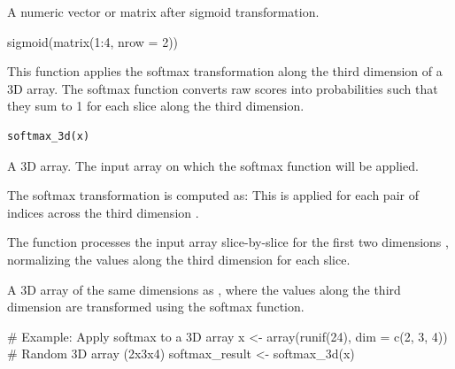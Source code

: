 \documentclass[a4paper]{book}
\begin{document}
%
\begin{Value}
A numeric vector or matrix after sigmoid transformation.
\end{Value}
%
\begin{Examples}
\begin{ExampleCode}
sigmoid(matrix(1:4, nrow = 2))
\end{ExampleCode}
\end{Examples}
%
\begin{Description}
This function applies the softmax transformation along the third dimension
of a 3D array. The softmax function converts raw scores into probabilities
such that they sum to 1 for each slice along the third dimension.
\end{Description}
%
\begin{Usage}
\begin{verbatim}
softmax_3d(x)
\end{verbatim}
\end{Usage}
%
\begin{Arguments}
\begin{ldescription}
\item[\code{x}] A 3D array. The input array on which the softmax function will be applied.
\end{ldescription}
\end{Arguments}
%
\begin{Details}
The softmax transformation is computed as:
This is applied for each pair of indices  across the third dimension .

The function processes the input array slice-by-slice for the first two dimensions
, normalizing the values along the third dimension  for each slice.
\end{Details}
%
\begin{Value}
A 3D array of the same dimensions as , where the values along the
third dimension are transformed using the softmax function.
\end{Value}
%
\begin{Examples}
\begin{ExampleCode}
# Example: Apply softmax to a 3D array
x <- array(runif(24), dim = c(2, 3, 4)) # Random 3D array (2x3x4)
softmax_result <- softmax_3d(x)

\end{ExampleCode}
\end{Examples}
\end{document}
